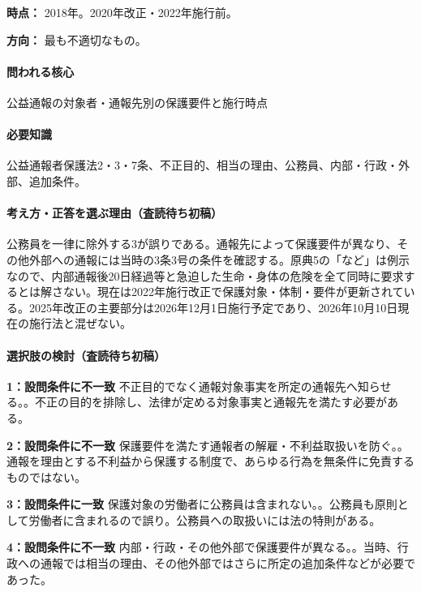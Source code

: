 \noindent\textbf{時点：} 2018年。2020年改正・2022年施行前。\par

\noindent\textbf{方向：} 最も不適切なもの。\par

\paragraph{問われる核心} 公益通報の対象者・通報先別の保護要件と施行時点

\paragraph{必要知識} 公益通報者保護法2・3・7条、不正目的、相当の理由、公務員、内部・行政・外部、追加条件。

\paragraph{考え方・正答を選ぶ理由（査読待ち初稿）} 公務員を一律に除外する3が誤りである。通報先によって保護要件が異なり、その他外部への通報には当時の3条3号の条件を確認する。原典5の「など」は例示なので、内部通報後20日経過等と急迫した生命・身体の危険を全て同時に要求するとは解さない。現在は2022年施行改正で保護対象・体制・要件が更新されている。2025年改正の主要部分は2026年12月1日施行予定であり、2026年10月10日現在の施行法と混ぜない。

\paragraph{選択肢の検討（査読待ち初稿）}\mbox{}\par

\noindent\textbf{1：設問条件に不一致} 不正目的でなく通報対象事実を所定の通報先へ知らせる。。不正の目的を排除し、法律が定める対象事実と通報先を満たす必要がある。\par

\noindent\textbf{2：設問条件に不一致} 保護要件を満たす通報者の解雇・不利益取扱いを防ぐ。。通報を理由とする不利益から保護する制度で、あらゆる行為を無条件に免責するものではない。\par

\noindent\textbf{3：設問条件に一致} 保護対象の労働者に公務員は含まれない。。公務員も原則として労働者に含まれるので誤り。公務員への取扱いには法の特則がある。\par

\noindent\textbf{4：設問条件に不一致} 内部・行政・その他外部で保護要件が異なる。。当時、行政への通報では相当の理由、その他外部ではさらに所定の追加条件などが必要であった。\par

